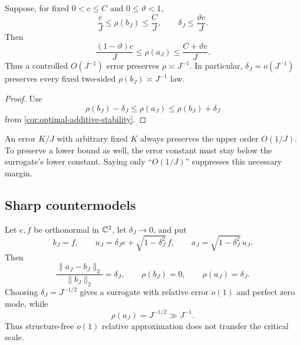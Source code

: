 \begin{theorem}
\label{thm:two-sided-transfer}
Suppose, for fixed \(0<c\le C\) and \(0\le\vartheta<1\),
\begin{equation}
 \frac{c}{J}\le\rho(b_J)\le\frac{C}{J},
 \qquad
 \delta_J\le\frac{\vartheta c}{J}.
\label{eq:two-sided-margin-hyp}
\end{equation}
Then
\begin{equation}
 \boxed{
 \frac{(1-\vartheta)c}{J}
 \le\rho(a_J)\le
 \frac{C+\vartheta c}{J}.}
\label{eq:two-sided-margin-conc}
\end{equation}
Thus a controlled \(O(J^{-1})\) error preserves
\(\rho\asymp J^{-1}\).  In particular,
\(\delta_J=o(J^{-1})\) preserves every fixed two-sided
\(\rho(b_J)\asymp J^{-1}\) law.
\end{theorem}

\begin{proof}
Use
\[
 \rho(b_J)-\delta_J
 \le\rho(a_J)\le
 \rho(b_J)+\delta_J
\]
from \cref{cor:optimal-additive-stability}.
\end{proof}

\begin{remark}
\label{rem:upper-vs-two-sided}
An error \(K/J\) with arbitrary fixed \(K\) always preserves the
upper order \(O(1/J)\).  To preserve a lower bound as well, the
error constant must stay below the surrogate's lower constant.
Saying only ``\(O(1/J)\)'' suppresses this necessary margin.
\end{remark}

\subsection{Sharp countermodels}

\begin{example}
\label{ex:o1-not-enough}
Let \(e,f\) be orthonormal in \(\mathbb C^2\), let
\(\delta_J\to0\), and put
\begin{equation}
 b_J=f,\qquad
 u_J=\delta_Je+\sqrt{1-\delta_J^2}\,f,\qquad
 a_J=\sqrt{1-\delta_J^2}\,u_J.
\label{eq:tangent-countermodel}
\end{equation}
Then
\begin{equation}
 \frac{\|a_J-b_J\|_2}{\|b_J\|_2}
 =\delta_J,\qquad
 \rho(b_J)=0,\qquad
 \rho(a_J)=\delta_J.
\label{eq:tangent-countermodel-values}
\end{equation}
Choosing \(\delta_J=J^{-1/2}\) gives a surrogate with relative error
\(o(1)\) and perfect zero mode, while
\[
 \rho(a_J)=J^{-1/2}\gg J^{-1}.
\]
Thus structure-free \(o(1)\) relative approximation does not
transfer the critical scale.
\end{example}

